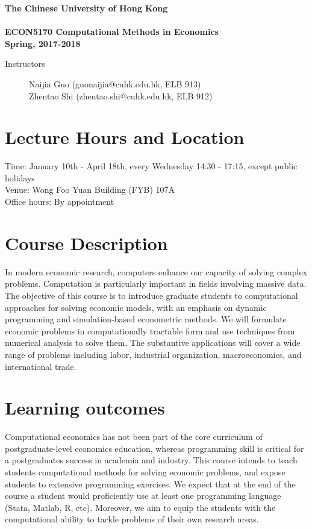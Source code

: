 \documentclass[11pt]{article}
\begin{document}
\begin{center}
  {\Large\bf The Chinese University of Hong Kong \\
  \ \\
ECON5170  Computational Methods in Economics \\
Spring, 2017-2018}
\end{center}

 \vspace{2pt}

\begin{description}
\item[Instructors] Naijia Guo (guonaijia@cuhk.edu.hk, ELB 913) \\
  Zhentao Shi (zhentao.shi@cuhk.edu.hk, ELB 912)
\end{description}

\section{Lecture Hours and Location}
Time: January 10th - April 18th, every Wednesday 14:30 - 17:15, except public holidays \\
Venue: Wong Foo Yuan Building (FYB) 107A\\
Office hours: By appointment




\section{Course Description}

In modern economic research, computers enhance our capacity of solving complex problems. Computation is particularly important in fields involving massive data. The objective of this course is to introduce graduate students to computational approaches for solving economic models, with an emphasis on dynamic programming and simulation-based econometric methods. We will formulate economic problems in computationally tractable form and use techniques from numerical analysis to solve them. The substantive applications will cover a wide range of problems including labor, industrial organization, macroeconomics, and international trade.

\section{Learning outcomes}

Computational economics has not been part of the core curriculum of postgraduate-level economics education, whereas programming skill is critical for a postgraduates success in academia and industry. This course intends to teach students computational methods for solving economic problems, and expose students to extensive programming exercises. We expect that at the end of the course a student would proficiently use at least one programming language (Stata, Matlab, R, etc). Moreover, we aim to equip the students with the computational ability to tackle problems of their own research areas.
\end{document}
